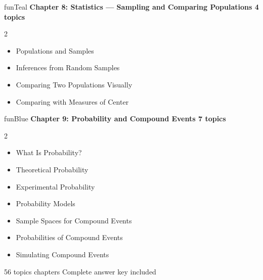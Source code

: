 {\vspace{2mm}

\begin{wbChapterStripe}{funTeal}
{\small\bfseries\color{black!80}Chapter 8: Statistics --- Sampling and Comparing Populations%
\hfill\normalfont\color{black!50}4 topics}

\vspace{1mm}
\small
\begin{multicols}{2}
\begin{itemize}[leftmargin=4mm, itemsep=1pt, topsep=1pt]
    \item Populations and Samples
    \item Inferences from Random Samples
    \item Comparing Two Populations Visually
    \item Comparing with Measures of Center
\end{itemize}
\end{multicols}
\end{wbChapterStripe}

\vspace{2mm}

\begin{wbChapterStripe}{funBlue}
{\small\bfseries\color{black!80}Chapter 9: Probability and Compound Events%
\hfill\normalfont\color{black!50}7 topics}

\vspace{1mm}
\small
\begin{multicols}{2}
\begin{itemize}[leftmargin=4mm, itemsep=1pt, topsep=1pt]
    \item What Is Probability?
    \item Theoretical Probability
    \item Experimental Probability
    \item Probability Models
    \item Sample Spaces for Compound Events
    \item Probabilities of Compound Events
    \item Simulating Compound Events
\end{itemize}
\end{multicols}
\end{wbChapterStripe}

\vspace{8mm}

\begin{center}
    {\color{black!50}\small\sffamily
    \faCalculator\hspace{2mm}56 topics
    \;\textbullet{} chapters
    \;\textbullet\; Complete answer key included}
\end{center}

}

\clearpage
